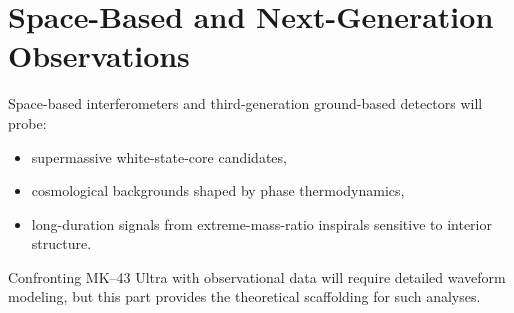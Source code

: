 \section{Space-Based and Next-Generation Observations}

Space-based interferometers and third-generation ground-based detectors will probe:
\begin{itemize}
  \item supermassive white-state-core candidates,
  \item cosmological backgrounds shaped by phase thermodynamics,
  \item long-duration signals from extreme-mass-ratio inspirals sensitive to interior structure.
\end{itemize}
Confronting MK--43 Ultra with observational data will require detailed waveform modeling, but this part provides the theoretical scaffolding for such analyses.
